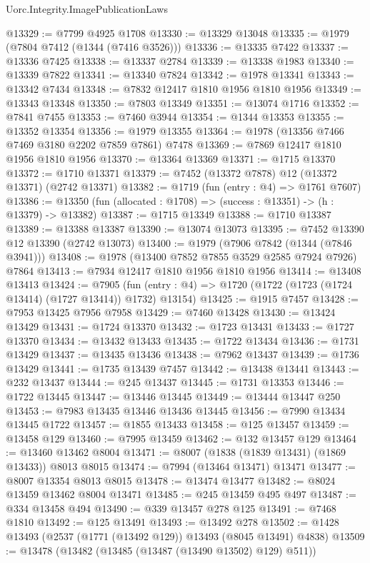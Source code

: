\begin{lexlean}{Uorc.Integrity.ImagePublicationLaws}
\begin{coremodule}
@13329 := @7799 @4925 @1708
@13330 := @13329 @13048
@13335 := @1979 (@7804 @7412 (@1344 (@7416 @3526)))
@13336 := @13335 @7422
@13337 := @13336 @7425
@13338 := @13337 @2784
@13339 := @13338 @1983
@13340 := @13339 @7822
@13341 := @13340 @7824
@13342 := @1978 @13341
@13343 := @13342 @7434
@13348 := @7832 @12417 @1810 @1956 @1810 @1956
@13349 := @13343 @13348
@13350 := @7803 @13349
@13351 := @13074 @1716
@13352 := @7841 @7455
@13353 := @7460 @3944
@13354 := @1344 @13353
@13355 := @13352 @13354
@13356 := @1979 @13355
@13364 := @1978 (@13356 @7466 @7469 @3180 @2202 @7859 @7861) @7478
@13369 := @7869 @12417 @1810 @1956 @1810 @1956
@13370 := @13364 @13369
@13371 := @1715 @13370
@13372 := @1710 @13371
@13379 := @7452 (@13372 @7878) @12 (@13372 @13371) (@2742 @13371)
@13382 := @1719 (fun (entry : @4) => @1761 @7607)
@13386 := @13350 (fun (allocated : @1708) => (success : @13351) -> (h : @13379) -> @13382)
@13387 := @1715 @13349
@13388 := @1710 @13387
@13389 := @13388 @13387
@13390 := @13074 @13073
@13395 := @7452 @13390 @12 @13390 (@2742 @13073)
@13400 := @1979 (@7906 @7842 (@1344 (@7846 @3941)))
@13408 := @1978 (@13400 @7852 @7855 @3529 @2585 @7924 @7926) @7864
@13413 := @7934 @12417 @1810 @1956 @1810 @1956
@13414 := @13408 @13413
@13424 := @7905
    (fun (entry : @4) => @1720 (@1722 (@1723 (@1724 @13414) (@1727 @13414)) @1732) @13154)
@13425 := @1915 @7457
@13428 := @7953 @13425 @7956 @7958
@13429 := @7460 @13428
@13430 := @13424 @13429
@13431 := @1724 @13370
@13432 := @1723 @13431
@13433 := @1727 @13370
@13434 := @13432 @13433
@13435 := @1722 @13434
@13436 := @1731 @13429
@13437 := @13435 @13436
@13438 := @7962 @13437
@13439 := @1736 @13429
@13441 := @1735 @13439 @7457
@13442 := @13438 @13441
@13443 := @232 @13437
@13444 := @245 @13437
@13445 := @1731 @13353
@13446 := @1722 @13445
@13447 := @13446 @13445
@13449 := @13444 @13447 @250
@13453 := @7983 @13435 @13446 @13436 @13445
@13456 := @7990 @13434 @13445 @1722
@13457 := @1855 @13433
@13458 := @125 @13457
@13459 := @13458 @129
@13460 := @7995 @13459
@13462 := @132 @13457 @129
@13464 := @13460 @13462 @8004
@13471 := @8007 (@1838 (@1839 @13431) (@1869 @13433)) @8013 @8015
@13474 := @7994 (@13464 @13471) @13471
@13477 := @8007 @13354 @8013 @8015
@13478 := @13474 @13477
@13482 := @8024 @13459 @13462 @8004 @13471
@13485 := @245 @13459 @495 @497
@13487 := @334 @13458 @494
@13490 := @339 @13457 @278 @125
@13491 := @7468 @1810
@13492 := @125 @13491
@13493 := @13492 @278
@13502 := @1428 @13493 (@2537 (@1771 (@13492 @129)) @13493 (@8045 @13491) @4838)
@13509 := @13478 (@13482 (@13485 (@13487 (@13490 @13502) @129) @511))

\end{coremodule}
\end{lexlean}
